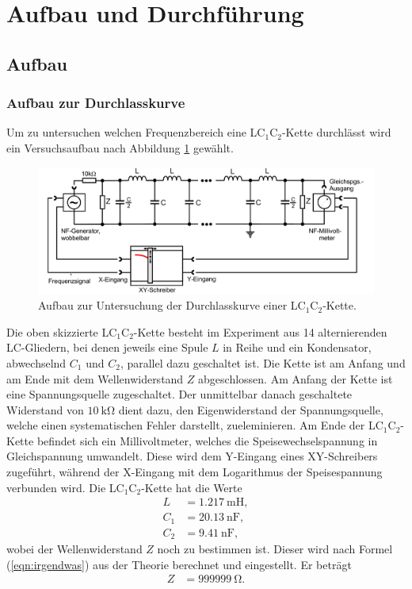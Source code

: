 \section{Aufbau und Durchführung}
\label{sec:Durchführung}
\subsection{Aufbau}
\subsubsection{Aufbau zur Durchlasskurve}
Um zu untersuchen welchen Frequenzbereich eine LC$_1$C$_2$-Kette durchlässt wird ein Versuchsaufbau nach Abbildung \ref{dfig:1} gewählt.

\begin{figure}[H]
  \centering
  \includegraphics{durchlass.png}
  \caption{Aufbau zur Untersuchung der Durchlasskurve einer LC$_1$C$_2$-Kette.}
  \label{dfig:1}
\end{figure}

Die oben skizzierte LC$_1$C$_2$-Kette besteht im Experiment aus 14 alternierenden LC-Gliedern, bei denen jeweils eine Spule $L$ in Reihe und ein Kondensator, abwechselnd $C_1$ und $C_2$, parallel dazu geschaltet ist.
Die Kette ist am Anfang und am Ende mit dem Wellenwiderstand $Z$ abgeschlossen.
Am Anfang der Kette ist eine Spannungsquelle zugeschaltet.
Der unmittelbar danach geschaltete Widerstand von $\SI{10}{\kilo\ohm}$ dient dazu, den Eigenwiderstand der Spannungsquelle, welche einen systematischen Fehler darstellt, zueleminieren.
Am Ende der LC$_1$C$_2$-Kette befindet sich ein Millivoltmeter, welches die Speisewechselspannung in Gleichspannung umwandelt.
Diese wird dem Y-Eingang eines XY-Schreibers zugeführt, während der X-Eingang mit dem Logarithmus der Speisespannung verbunden wird.
Die LC$_1$C$_2$-Kette hat die Werte
\begin{align*}
  L   &= \SI{1,217}{\milli\henry},\\
  C_1 &= \SI{20,13}{\nano\farad},\\
  C_2 &= \SI{9,41}{\nano\farad},
\end{align*}
wobei der Wellenwiderstand $Z$ noch zu bestimmen ist.
Dieser wird nach Formel (\ref{eqn:irgendwas}) aus der Theorie berechnet und eingestellt.
Er beträgt
\begin{align*}
  Z   &= \SI{999999}{\ohm}.
\end{align*}

